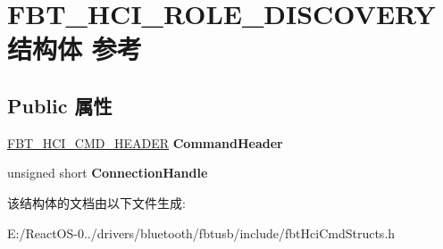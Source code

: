 \hypertarget{struct_f_b_t___h_c_i___r_o_l_e___d_i_s_c_o_v_e_r_y}{}\section{F\+B\+T\+\_\+\+H\+C\+I\+\_\+\+R\+O\+L\+E\+\_\+\+D\+I\+S\+C\+O\+V\+E\+R\+Y结构体 参考}
\label{struct_f_b_t___h_c_i___r_o_l_e___d_i_s_c_o_v_e_r_y}
\subsection*{Public 属性}
\begin{DoxyCompactItemize}
\item 
\mbox{\label{struct_f_b_t___h_c_i___r_o_l_e___d_i_s_c_o_v_e_r_y_a6ea66a418e12f6b1971409b71377d709}} 
\hyperlink{struct_f_b_t___h_c_i___c_m_d___h_e_a_d_e_r}{F\+B\+T\+\_\+\+H\+C\+I\+\_\+\+C\+M\+D\+\_\+\+H\+E\+A\+D\+ER} {\bfseries Command\+Header}
\item 
\mbox{\label{struct_f_b_t___h_c_i___r_o_l_e___d_i_s_c_o_v_e_r_y_a8253702d06019beac71e659cd3d0f278}} 
unsigned short {\bfseries Connection\+Handle}
\end{DoxyCompactItemize}


该结构体的文档由以下文件生成\+:\begin{DoxyCompactItemize}
\item 
E\+:/\+React\+O\+S-\/0../drivers/bluetooth/fbtusb/include/fbt\+Hci\+Cmd\+Structs.\+h\end{DoxyCompactItemize}
